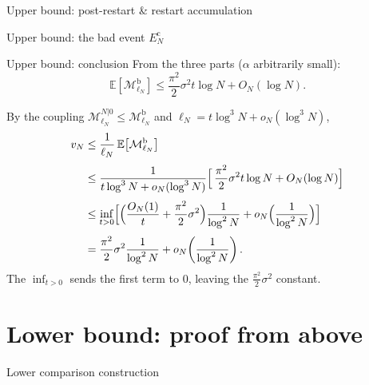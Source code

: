 \documentclass[10pt, aspectratio=169]{beamer}
\begin{document}
\begin{frame}{Upper bound: post-restart \& restart accumulation}
    
\end{frame}

\begin{frame}{Upper bound: the bad event $E_N^{\mathrm{c}}$}
    
\end{frame}

\begin{frame}{Upper bound: conclusion}
    \small
    From the three parts ($\alpha$ arbitrarily small):
    \[
        \mathbb{E}\!\left[\mathcal{M}_{\ell_N}^{\mathrm{b}}\right]
        \le
        \frac{\pi^2}{2}\sigma^2 t\log N + O_N(\log N).
    \]

    By the coupling $\mathcal{M}_{\ell_N}^{N|0}\le\mathcal{M}_{\ell_N}^{\mathrm{b}}$ and
    $\ell_N = t\log^3 N + o_N(\log^3 N)$,
    \begin{align*}
        v_N
        &\le \frac{1}{\ell_N}\,\mathbb{E}\!\left[\mathcal{M}_{\ell_N}^{\mathrm{b}}\right] \\[3pt]
        &\le \frac{1}{t\log^3 N + o_N(\log^3 N)}
            \Bigl[\,\frac{\pi^2}{2}\sigma^2 t\log N + O_N(\log N)\Bigr] \\[3pt]
        &\le \inf_{t>0}\Bigl[
              \Bigl(\frac{O_N(1)}{t} + \frac{\pi^2}{2}\sigma^2\Bigr)\frac{1}{\log^2 N}
              + o_N\Bigl(\frac{1}{\log^2 N}\Bigr)
            \Bigr] \\[3pt]
        &= \frac{\pi^2}{2}\sigma^2\frac{1}{\log^2 N}
           + o_N\!\left(\frac{1}{\log^2 N}\right).
    \end{align*}
    The $\inf_{t>0}$ sends the first term to $0$, leaving the $\frac{\pi^2}{2}\sigma^2$ constant.
\end{frame}

\section{Lower bound: proof from above}

\begin{frame}{Lower comparison construction}
    \begin{columns}
        \small
        
        \centering
        \resizebox{\textwidth}{!}{}
    \end{columns}
\end{frame}
\end{document}
